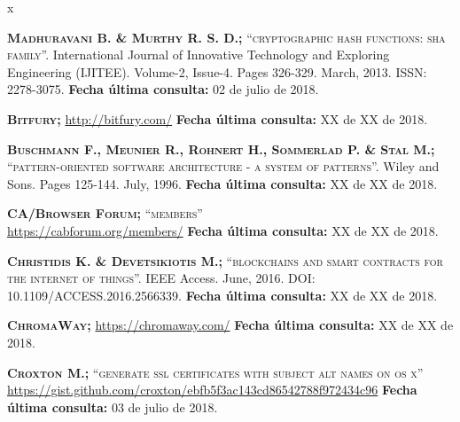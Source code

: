 \begin{thebibliography} {x}
				
	 \textsc{\textbf{Madhuravani B. \& Murthy R. S. D.; }}\textsc{“cryptographic hash functions: sha family”.} International Journal of Innovative Technology and Exploring Engineering (IJITEE). Volume-2, Issue-4. Pages 326-329. March, 2013. ISSN: 2278-3075.
	\newline \textbf{Fecha última consulta:} 02 de julio de 2018.
		
	 \textsc{\textbf{Bitfury; }} 
	\url{http://bitfury.com/}
	\newline \textbf{Fecha última consulta:} XX de XX de 2018.
			
	 \textsc{\textbf{Buschmann F., Meunier R., Rohnert H., Sommerlad P. \& Stal M.; }}\textsc{“pattern-oriented software architecture - a system of patterns”.} Wiley and Sons. Pages 125-144. July, 1996.
	\newline \textbf{Fecha última consulta:} XX de XX de 2018.
		
	 \textsc{\textbf{CA/Browser Forum; }}\textsc{“members”} \\ 
	\url{https://cabforum.org/members/}
	\newline \textbf{Fecha última consulta:} XX de XX de 2018.
		
	 \textsc{\textbf{Christidis K. \& Devetsikiotis M.; }}\textsc{“blockchains and smart contracts for the internet of things”.} IEEE Access. June, 2016. DOI: 10.1109/ACCESS.2016.2566339. 
	\newline \textbf{Fecha última consulta:} {\color{red}XX de XX de 2018.}
	
	 \textsc{\textbf{ChromaWay; }} 
	\url{https://chromaway.com/}
	\newline \textbf{Fecha última consulta:} XX de XX de 2018.
	
	 \textsc{\textbf{Croxton M.; }}\textsc{“generate ssl certificates with subject alt names on os x”} \\ 
	\url{https://gist.github.com/croxton/ebfb5f3ac143cd86542788f972434c96}
	\newline \textbf{Fecha última consulta:} 03 de julio de 2018.
		

\end{thebibliography}
